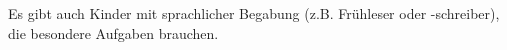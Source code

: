 Es gibt auch Kinder mit sprachlicher Begabung (z.B. Frühleser oder -schreiber), die besondere Aufgaben brauchen.